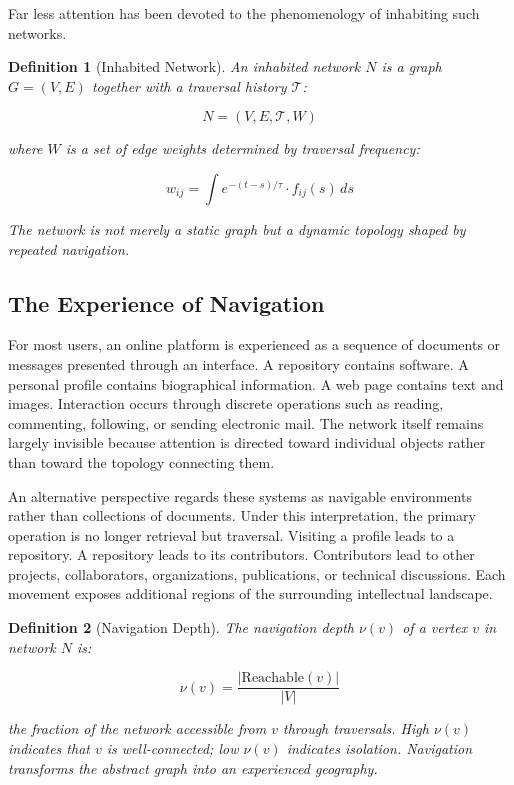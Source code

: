 \documentclass[12pt,oneside]{article}
\newtheorem{definition}{Definition}[section]
\theoremstyle{remark}
\begin{document}
Far less attention has been devoted to the phenomenology of inhabiting such networks.

\begin{definition}[Inhabited Network]
An inhabited network $N$ is a graph $G = (V, E)$ together with a traversal history $\mathcal{T}$:

\begin{equation}
N = (V, E, \mathcal{T}, W)
\end{equation}

where $W$ is a set of edge weights determined by traversal frequency:

\begin{equation}
w_{ij} = \int e^{-(t - s)/\tau} \cdot f_{ij}(s) \, ds
\end{equation}

The network is not merely a static graph but a dynamic topology shaped by repeated navigation.
\end{definition}

\subsection{The Experience of Navigation}

For most users, an online platform is experienced as a sequence of documents or messages presented through an interface. A repository contains software. A personal profile contains biographical information. A web page contains text and images. Interaction occurs through discrete operations such as reading, commenting, following, or sending electronic mail. The network itself remains largely invisible because attention is directed toward individual objects rather than toward the topology connecting them.

An alternative perspective regards these systems as navigable environments rather than collections of documents. Under this interpretation, the primary operation is no longer retrieval but traversal. Visiting a profile leads to a repository. A repository leads to its contributors. Contributors lead to other projects, collaborators, organizations, publications, or technical discussions. Each movement exposes additional regions of the surrounding intellectual landscape.

\begin{definition}[Navigation Depth]
The navigation depth $\nu(v)$ of a vertex $v$ in network $N$ is:

\begin{equation}
\nu(v) = \frac{|\text{Reachable}(v)|}{|V|}
\end{equation}

the fraction of the network accessible from $v$ through traversals. High $\nu(v)$ indicates that $v$ is well-connected; low $\nu(v)$ indicates isolation. Navigation transforms the abstract graph into an experienced geography.
\end{definition}
\end{document}
